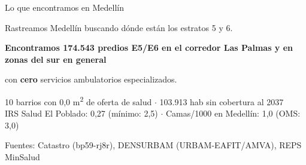 \documentclass[aspectratio=169, 11pt]{beamer}
\begin{document}
\begin{frame}{Lo que encontramos en Medell\'{i}n}
\vfill
\begin{center}
{\normalsize Rastreamos Medell\'{i}n buscando d\'{o}nde est\'{a}n los estratos 5 y 6.}

\vspace{10pt}

{\Large\bfseries Encontramos \textcolor{acc}{174.543 predios E5/E6} en el corredor Las Palmas y en zonas del sur en general}

\vspace{10pt}

{\normalsize con \textcolor{comp}{\textbf{cero}} servicios ambulatorios especializados.}

\vspace{12pt}

{\small\color{slate}
10 barrios con 0,0 m\textsuperscript{2} de oferta de salud $\cdot$ 103.913 hab sin cobertura al 2037\\
IRS Salud El Poblado: 0,27 (m\'{i}nimo: 2,5) $\cdot$ Camas/1000 en Medell\'{i}n: 1,0 (OMS: 3,0)
}
\end{center}
\vfill
{\tiny\color{slate} Fuentes: Catastro (bp59-rj8r), DENSURBAM (URBAM-EAFIT/AMVA), REPS MinSalud}
\end{frame}
\end{document}

